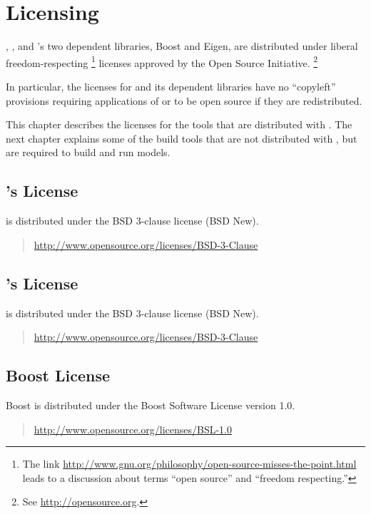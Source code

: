 \chapter{Licensing}\label{licensing.appendix}

\noindent
\CmdStan, \Stan, and \Stan's two dependent libraries, Boost and Eigen, are
distributed under liberal freedom-respecting%
%
\footnote{The link
  \url{http://www.gnu.org/philosophy/open-source-misses-the-point.html}
  leads to a discussion about terms ``open
  source'' and ``freedom respecting.''}
%
licenses approved by the Open Source Initiative.%
\footnote{See \url{http://opensource.org}.}  

In particular, the licenses for \CmdStan and its dependent libraries
have no ``copyleft'' provisions requiring applications of \CmdStan or
\Stan to be open source if they are redistributed.

This chapter describes the licenses for the tools that are distributed
with \CmdStan.  The next chapter explains some of the build tools that
are not distributed with \CmdStan, but are required to build and run
\Stan models.

\section{\CmdStan's License}

\CmdStan is distributed under the BSD 3-clause license (BSD New).
%
\begin{quote}
\url{http://www.opensource.org/licenses/BSD-3-Clause}
\end{quote}

\section{\Stan's License}

\Stan is distributed under the BSD 3-clause license (BSD New).
%
\begin{quote}
\url{http://www.opensource.org/licenses/BSD-3-Clause}
\end{quote}

\section{Boost License}

Boost is distributed under the Boost Software
License version 1.0.
%
\begin{quote}
\url{http://www.opensource.org/licenses/BSL-1.0}
\end{quote}

